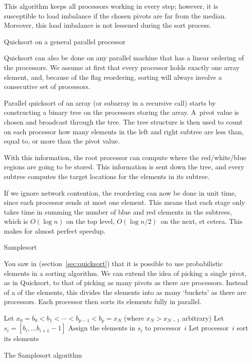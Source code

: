 This algorithm keeps all processors working in every step; however, it
is susceptible to load imbalance if the chosen pivots are far from the
median. Moreover, this load imbalance is not lessened during the sort
process.

 {Quicksort on a general parallel processor}

Quicksort can also be done on any parallel machine that has a linear
ordering of the processors. We assume at first that every processor
holds exactly one array element, and, because of the flag reordering,
sorting will always involve a consecutive set of processors.

Parallel quicksort of an array (or subarray in a recursive call)
starts by constructing a binary tree on the processors storing the
array. A~pivot value is chosen and broadcast through the tree. The
tree structure is then used to count on each processor how many
elements in the left and right subtree are less than, equal to, or
more than the pivot value. 

With this information, the root processor can compute where the
red/white/blue regions are going to be stored. This information is
sent down the tree, and every subtree computes the target locations
for the elements in its subtree.

If we ignore network contention, the reordering can now be done in
unit time, since each processor sends at most one element. This means
that each stage only takes time in summing the number of blue and red
elements in the subtrees, which is $O(\log n)$ on the top level,
$O(\log n/2)$~on the next, et cetera. This makes for almost perfect
speedup.


 {Samplesort}
\label{sec:samplesort}

You saw in  (section~\ref{sec:quicksort}) that
it is possible to use probabilistic elements in a sorting
algorithm. We can extend the idea of picking a single pivot, as in
Quicksort, to that of picking as many pivots as there are processors.
Instead of a  of the elements, this divides the
elements into as many `buckets' as there are processors. Each
processor then sorts its elements fully in parallel.

\begin{displayalgorithm}
  Let $x_0=b_0<b_1<\cdots<b_{p-1}<b_p=x_N$ (where $x_N>x_{N-1}$ arbitrary)\;
   { Let $s_i=[b_i,\ldots b_{i+1}-1]$ }
   { Assign the elements in $s_i$ to
    processor~$i$ }
   { Let processor~$i$ sort its
    elements }
  \caption{The Samplesort algorithm}
\end{displayalgorithm}

